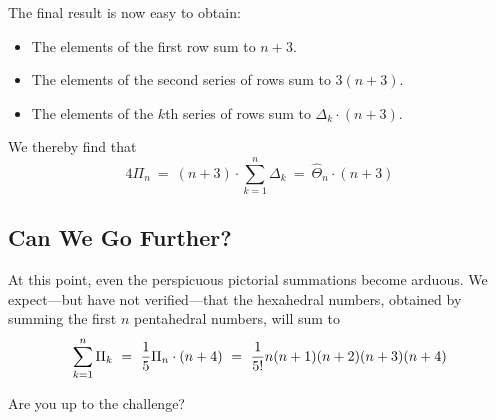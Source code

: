 The final result is now easy to obtain:
\begin{itemize}
\item 
The elements of the first row sum to $n+3$.
\item
The elements of the second series of rows sum to $3 (n+3)$. 
\item
The elements of the $k$th series of rows sum to $\Delta_k \cdot (n+3)$.
\end{itemize}
We thereby find that
\[
4 \Pi_n \ = \ (n+3) \cdot \sum_{k=1}^{n} \Delta_k \ = \ \widehat{\Theta}_n \cdot (n+3)
\]

\subsection{Can We Go Further?}

At this point, even the perspicuous pictorial summations become arduous.  We expect---but have not verified---that the hexahedral numbers, obtained by summing the first $n$ pentahedral numbers, will sum to
\[ \sum_{k=1}^n \Pi_k \ = \ {1 \over 5} \Pi_n \cdot (n+4) \ = \ 
{1 \over 5!} n (n+1) (n+2) (n+3) (n+4)
\]

Are you up to the challenge?

